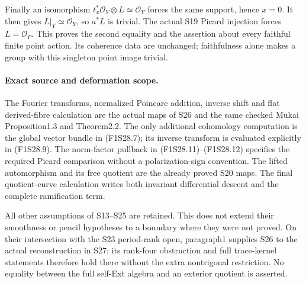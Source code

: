 Finally an isomorphism
$t_x^*\mathcal O_Y\otimes L\simeq\mathcal O_Y$
forces the same support, hence $x=0$. It then gives
$L|_Y\simeq\mathcal O_Y$, so $a^*L$ is trivial.
The actual S19 Picard injection forces
$L=\mathcal O_P$. This proves the second equality
and the assertion about every faithful finite point
action. Its coherence data are unchanged; faithfulness
alone makes a group with this singleton point image
trivial.

\paragraph{Exact source and deformation scope.}
The Fourier transforms, normalized Poincare addition,
inverse shift and flat derived-fibre calculation are
the actual maps of S26 and the same checked Mukai
Proposition1.3 and Theorem2.2. The only additional
cohomology computation is the global vector bundle
in (F1S28.7); its inverse transform is evaluated
explicitly in (F1S28.9). The norm-factor pullback in
(F1S28.11)--(F1S28.12) specifies the required Picard
comparison without a polarization-sign convention.
The lifted automorphism and its free quotient are
the already proved S20 maps. The final quotient-curve
calculation writes both invariant differential descent
and the complete ramification term.

All other assumptions of S13--S25 are retained. This
does not extend their smoothness or pencil hypotheses
to a boundary where they were not proved. On their
intersection with the S23 period-rank open, paragraph1
supplies S26 to the actual reconstruction in S27; its
rank-four obstruction and full trace-kernel statements
therefore hold there without the extra nontrigonal
restriction. No equality between the full self-Ext
algebra and an exterior quotient is asserted.
